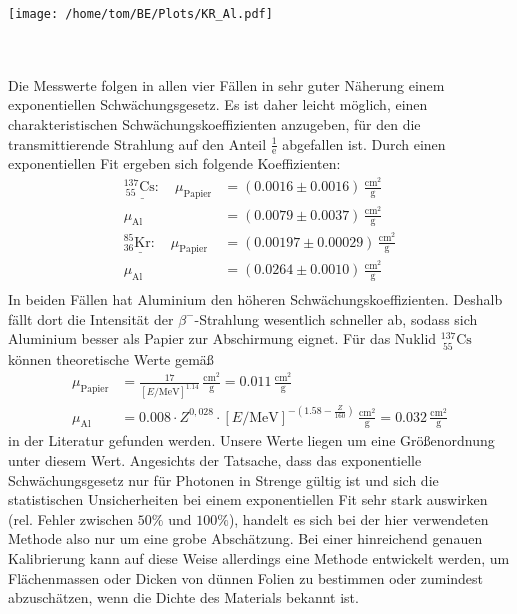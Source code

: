 \documentclass[german,  %
parskip=full,  %
]{scrartcl}
\begin{document}
\begin{minipage}{0.5\textwidth}\centering
\texttt{[image: /home/tom/BE/Plots/KR\_Al.pdf]}
\end{minipage} \\\\
Die Messwerte folgen in allen vier Fällen in sehr guter Näherung einem exponentiellen Schwächungsgesetz. Es ist daher leicht möglich, einen charakteristischen Schwächungskoeffizienten anzugeben, für den die transmittierende Strahlung auf den Anteil \(\frac{1}{\mathrm{e}}\) abgefallen ist. Durch einen exponentiellen Fit ergeben sich folgende Koeffizienten:
\begin{align*}
\underline{^{137}_{\ 55}\mathrm{Cs}:} \quad \mu_{\mathrm{Papier}} &= (0.0016 \pm 0.0016)\,\frac{\mathrm{cm}^2}{\mathrm{g}}\\
\mu_{\mathrm{Al}} &= (0.0079 \pm 0.0037)\,\frac{\mathrm{cm}^2}{\mathrm{g}} \\
\underline{^{85}_{36}\mathrm{Kr}:} \quad\mu_{\mathrm{Papier}} &= (0.00197 \pm 0.00029)\,\frac{\mathrm{cm}^2}{\mathrm{g}} \\
\mu_{\mathrm{Al}} &= (0.0264 \pm 0.0010)\,\frac{\mathrm{cm}^2}{\mathrm{g}} \\
\end{align*}
In beiden Fällen hat Aluminium den höheren Schwächungskoeffizienten. Deshalb fällt dort die Intensität der \(\beta^-\)-Strahlung wesentlich schneller ab, sodass sich Aluminium besser als Papier zur Abschirmung eignet. Für das Nuklid \(^{137}_{\ 55}\mathrm{Cs}\) können theoretische Werte gemäß
\begin{align*}
\mu_{\mathrm{Papier}} &= \frac{17}{\left[E/\mathrm{MeV}\right]^{1.14}}\,\frac{\mathrm{cm}^2}{\mathrm{g}} = 0.011\,\frac{\mathrm{cm}^2}{\mathrm{g}}  \\
\mu_{\mathrm{Al}} &= 0.008\cdot Z^{0,028}\cdot\left[E/\mathrm{MeV}\right]^{-\left(1.58-\frac{Z}{160}\right)}\,\frac{\mathrm{cm}^2}{\mathrm{g}} = 0.032\,\frac{\mathrm{cm}^2}{\mathrm{g}}
\end{align*}
in der Literatur gefunden werden. Unsere Werte liegen um eine Größenordnung unter diesem Wert. Angesichts der Tatsache, dass das exponentielle Schwächungsgesetz nur für Photonen in Strenge gültig ist und sich die statistischen Unsicherheiten bei einem exponentiellen Fit sehr stark auswirken (rel. Fehler zwischen \(50\%\) und \(100\%\)), handelt es sich bei der hier verwendeten Methode also nur um eine grobe Abschätzung. Bei einer hinreichend genauen Kalibrierung kann auf diese Weise allerdings eine Methode entwickelt werden, um Flächenmassen oder Dicken von dünnen Folien zu bestimmen oder zumindest abzuschätzen, wenn die Dichte des Materials bekannt ist.
\end{document}
